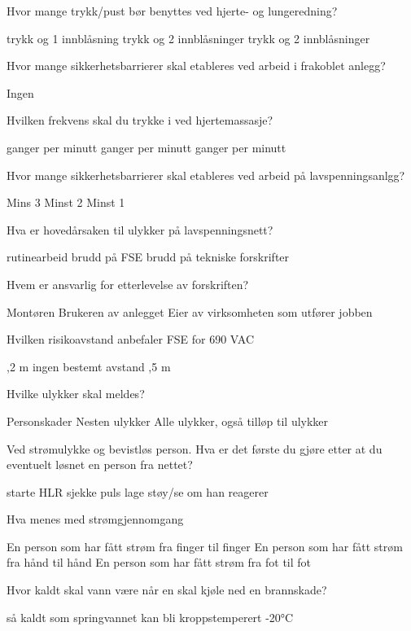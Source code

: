 \documentclass{exam}
\begin{document}
\begin{questions}
	\question Hvor mange trykk/pust bør benyttes ved hjerte- og lungeredning?
		\begin{oneparcheckboxes}
			 trykk og 1 innblåsning
			 trykk og 2 innblåsninger
			 trykk og 2 innblåsninger
		\end{oneparcheckboxes}
	\question Hvor mange sikkerhetsbarrierer skal etableres ved arbeid i frakoblet anlegg?
		\begin{oneparcheckboxes}
			\choice 2
			\choice Ingen
			\choice 3
		\end{oneparcheckboxes}
	\question Hvilken frekvens skal du trykke i ved hjertemassasje?
		\begin{oneparcheckboxes}
			 ganger per minutt
			 ganger per minutt
			 ganger per minutt
		\end{oneparcheckboxes}
	\question Hvor mange sikkerhetsbarrierer skal etableres ved arbeid på lavspenningsanlgg?
		\begin{oneparcheckboxes}
			\choice Mins 3
			\choice Minst 2
			\choice Minst 1
		\end{oneparcheckboxes}
	\question Hva er hovedårsaken til ulykker på lavspenningsnett?
		\begin{oneparcheckboxes}
			\choice rutinearbeid
			\choice brudd på FSE
			\choice brudd på tekniske forskrifter
		\end{oneparcheckboxes}
	\question Hvem er ansvarlig for etterlevelse av forskriften?
		\begin{oneparcheckboxes}
			\choice Montøren
			\choice Brukeren av anlegget
			\choice Eier av virksomheten som utfører jobben
		\end{oneparcheckboxes}
	\question Hvilken risikoavstand anbefaler FSE for 690 VAC
		\begin{oneparcheckboxes}
			\choice 1,2 m
			\choice ingen bestemt avstand
			\choice 0,5 m
		\end{oneparcheckboxes}
	\question Hvilke ulykker skal meldes?
		\begin{oneparcheckboxes}
			\choice Personskader
			\choice Nesten ulykker
			\choice Alle ulykker, også tilløp til ulykker
		\end{oneparcheckboxes}
	\question Ved strømulykke og bevistløs person. Hva er det første du gjøre etter at du eventuelt løsnet en person fra nettet?
		\begin{oneparcheckboxes}
			\choice starte HLR
			\choice sjekke puls
			\choice lage støy/se om han reagerer
		\end{oneparcheckboxes}
	\question Hva menes med strømgjennomgang
		\begin{oneparcheckboxes}
			\choice En person som har fått strøm fra finger til finger
			\choice En person som har fått strøm fra hånd til hånd
			\choice En person som har fått strøm fra fot til fot
			\choice 
		\end{oneparcheckboxes}
	\question Hvor kaldt skal vann være når en skal kjøle ned en brannskade?
		\begin{oneparcheckboxes}
			\choice så kaldt som springvannet kan bli
			\choice kroppstemperert
			5-20°C
		\end{oneparcheckboxes}


\end{questions}
\end{document}
